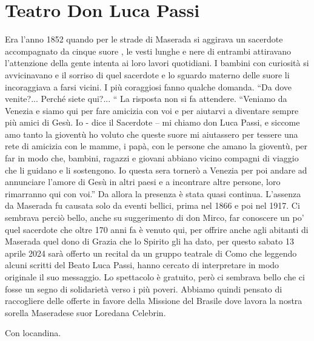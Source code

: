 \section{Teatro Don Luca Passi}
Era l’anno 1852 quando per le strade di Maserada si aggirava un sacerdote accompagnato da cinque suore , le vesti lunghe e nere di entrambi attiravano l’attenzione della gente intenta ai loro lavori quotidiani.
 I bambini con curiosità si avvicinavano e il sorriso di quel sacerdote e lo sguardo materno delle suore li incoraggiava a farsi vicini. I più coraggiosi fanno qualche domanda.
“Da dove venite?... Perché siete qui?... “
La risposta non si fa attendere. “Veniamo da Venezia e siamo qui per fare amicizia con voi e per aiutarvi a diventare sempre più amici di Gesù.
Io - dice il Sacerdote – mi chiamo don Luca Passi, e siccome amo tanto la gioventù ho voluto che queste suore mi aiutassero per tessere una rete di amicizia con le mamme, i papà, con le persone che amano la gioventù, per far in modo che, bambini, ragazzi e giovani abbiano vicino compagni di viaggio che li guidano e li sostengono.  Io questa sera tornerò a Venezia per poi andare ad annunciare l’amore di Gesù in altri paesi e a incontrare altre persone, loro rimarranno  qui con voi.”
Da allora la presenza è stata quasi continua. L’assenza da Maserada fu causata solo da eventi bellici, prima nel 1866 e poi nel 1917.
Ci sembrava perciò bello, anche su suggerimento di don Mirco, far conoscere un po’ quel sacerdote che  oltre 170 anni fa è venuto qui, per offrire anche agli abitanti di Maserada quel dono di Grazia che lo Spirito gli ha dato, per questo sabato 13 aprile 2024 sarà offerto un recital da un gruppo teatrale di Como che leggendo alcuni scritti del Beato Luca Passi, hanno cercato di interpretare in modo originale il suo messaggio.
Lo spettacolo è gratuito, però ci sembrava bello che ci fosse un segno di solidarietà verso i più poveri.
Abbiamo quindi pensato di raccogliere delle offerte in favore della Missione  del Brasile dove lavora la nostra sorella Maseradese suor Loredana Celebrin.

Con locandina.


